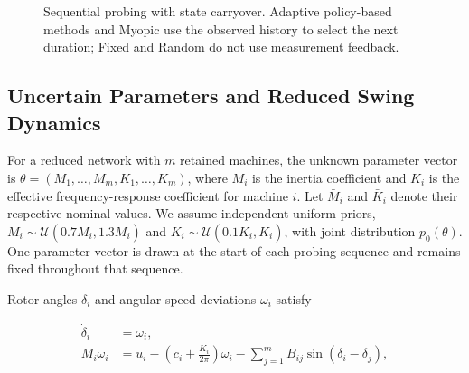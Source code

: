 \documentclass[conference,letterpaper]{IEEEtran}
\begin{document}
\begin{figure}[!t]
\centering
{}
\caption{Sequential probing with state carryover. Adaptive policy-based methods and Myopic use the observed history to select the next duration; Fixed and Random do not use measurement feedback.}
\label{fig:workflow}
\end{figure}

\subsection{Uncertain Parameters and Reduced Swing Dynamics}


For a reduced network with $m$ retained machines, the unknown parameter vector is $\theta=(M_1,\ldots,M_m,K_1,\ldots,K_m)$, where $M_i$ is the inertia coefficient and $K_i$ is the effective frequency-response coefficient for machine $i$. Let $\bar M_i$ and $\bar K_i$ denote their respective nominal values. We assume independent uniform priors, $M_i\sim\mathcal U(0.7\bar M_i,1.3\bar M_i)$ and $K_i\sim\mathcal U(0.1\bar K_i,\bar K_i)$, with joint distribution $p_0(\theta)$. One parameter vector is drawn at the start of each probing sequence and remains fixed throughout that sequence.


Rotor angles $\delta_i$ and angular-speed deviations $\omega_i$ satisfy


\begin{equation}
\begin{aligned}
\dot{\delta}_i &= \omega_i,\\
M_i\dot{\omega}_i
&= u_i-\left(c_i+\frac{K_i}{2\pi}\right)\omega_i-\sum_{j=1}^{m}B_{ij}
\sin(\delta_i-\delta_j),
\end{aligned}
\label{eq:swing}
\end{equation}
\end{document}

